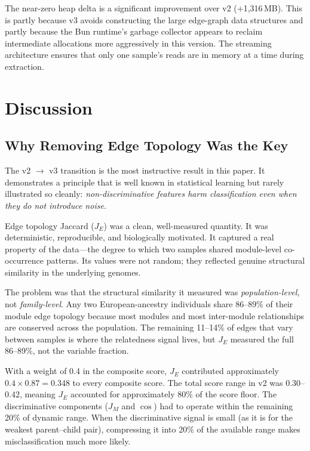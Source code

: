 \documentclass{../yalumba}
\begin{document}
The near-zero heap delta is a significant improvement over v2
($+$1{,}316\,MB).  This is partly because v3 avoids constructing the large
edge-graph data structures and partly because the Bun runtime's garbage
collector appears to reclaim intermediate allocations more aggressively in
this version.  The streaming architecture ensures that only one sample's
reads are in memory at a time during extraction.


\section{Discussion}
\label{sec:discussion}

\subsection{Why Removing Edge Topology Was the Key}

The v2 $\to$ v3 transition is the most instructive result in this paper.
It demonstrates a principle that is well known in statistical learning but
rarely illustrated so cleanly: \emph{non-discriminative features harm
classification even when they do not introduce noise.}

Edge topology Jaccard ($J_E$) was a clean, well-measured quantity.  It was
deterministic, reproducible, and biologically motivated.  It captured a real
property of the data---the degree to which two samples shared module-level
co-occurrence patterns.  Its values were not random; they reflected genuine
structural similarity in the underlying genomes.

The problem was that the structural similarity it measured was
\emph{population-level}, not \emph{family-level}.  Any two European-ancestry
individuals share 86--89\% of their module edge topology because most modules
and most inter-module relationships are conserved across the population.  The
remaining 11--14\% of edges that vary between samples is where the relatedness
signal lives, but $J_E$ measured the full 86--89\%, not the variable fraction.


With a weight of 0.4 in the composite score, $J_E$ contributed approximately
$0.4 \times 0.87 = 0.348$ to every composite score.  The total score range
in v2 was $0.30$--$0.42$, meaning $J_E$ accounted for approximately 80\% of
the score floor.  The discriminative components ($J_M$ and $\cos$) had to
operate within the remaining 20\% of dynamic range.  When the discriminative
signal is small (as it is for the weakest parent--child pair), compressing it
into 20\% of the available range makes misclassification much more likely.
\end{document}

